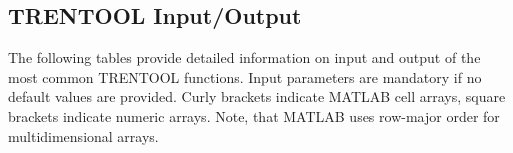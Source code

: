 \documentclass[a4paper,10pt]{article}
\begin{document}
\subsection{TRENTOOL Input/Output}

The following tables provide detailed information on input and output of the most common TRENTOOL functions. Input parameters are mandatory if no default values are provided. Curly brackets indicate MATLAB cell arrays, square brackets indicate numeric arrays. Note, that MATLAB uses row-major order for multidimensional arrays.


\onehalfspacing









\newpage


\end{document}
